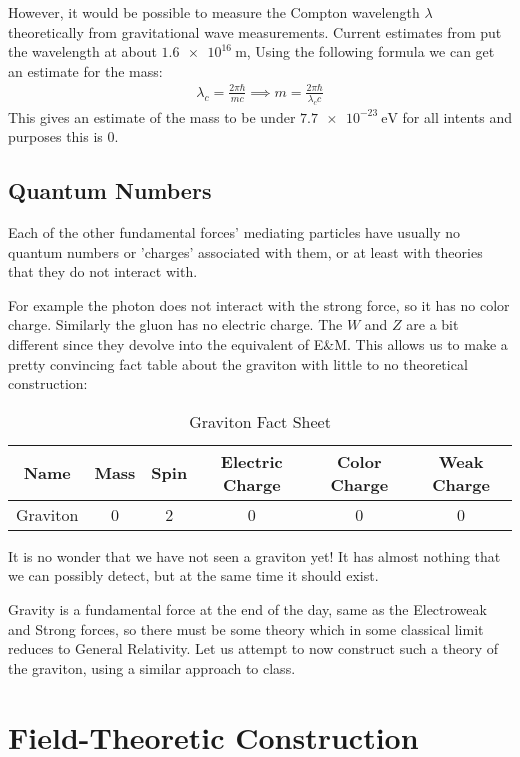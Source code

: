 \documentclass[12pt]{article}
\begin{document}
However, it would be possible to measure the Compton wavelength $\lambda$ theoretically from gravitational wave measurements. Current estimates from \cite{compwavelen} put the wavelength at about $\SI{1.6e16}{\m}$, Using the following formula we can get an estimate for the mass:
\begin{align*}
  \lambda_c=\frac{2\pi\hbar}{mc}\implies m=\frac{2\pi\hbar}{\lambda_cc}
\end{align*}
This gives an estimate of the mass to be under $\SI{7.7e-23}{\eV}$ for all intents and purposes this is 0.
\subsection{Quantum Numbers}
Each of the other fundamental forces' mediating particles have usually no quantum numbers or 'charges' associated with them, or at least with theories that they do not interact with.

For example the photon does not interact with the strong force, so it has no color charge. Similarly the gluon has no electric charge. The $W$ and $Z$ are a bit different since they devolve into the equivalent of E\&M. This allows us to make a pretty convincing fact table about the graviton with little to no theoretical construction:
\begin{table}[H]
  \centering
  \begin{tabular}{c|c|c|c|c|c}
    Name&Mass&Spin&Electric Charge&Color Charge&Weak Charge\\\hline
    Graviton&0&2&0&0&0
  \end{tabular}
  \caption{Graviton Fact Sheet}
  \label{tab:2}
\end{table}
It is no wonder that we have not seen a graviton yet! It has almost nothing that we can possibly detect, but at the same time it should exist.

Gravity is a fundamental force at the end of the day, same as the Electroweak and Strong forces, so there must be some theory which in some classical limit reduces to General Relativity. Let us attempt to now construct such a theory of the graviton, using a similar approach to class. 
\section{Field-Theoretic Construction}
\end{document}

